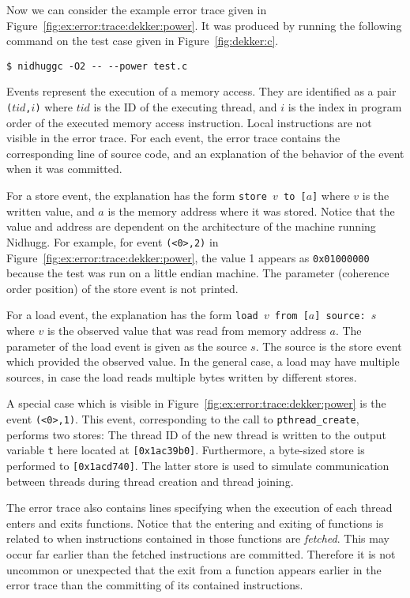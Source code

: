 \documentclass[a4paper]{article}
\begin{document}
Now we can consider the example error trace given in
Figure~\ref{fig:ex:error:trace:dekker:power}. It was produced by
running the following command on the test case given in
Figure~\ref{fig:dekker:c}.

\noindent
\begin{verbatim}
$ nidhuggc -O2 -- --power test.c
\end{verbatim}

\noindent
Events represent the execution of a memory access. They are identified
as a pair \texttt{($tid$,$i$)} where $tid$ is the ID of the executing
thread, and $i$ is the index in program order of the executed memory
access instruction. Local instructions are not visible in the error
trace. For each event, the error trace contains the corresponding line
of source code, and an explanation of the behavior of the event when
it was committed.

For a store event, the explanation has the form
\texttt{store~$v$~to~[$a$]} where $v$ is the written value, and $a$ is
the memory address where it was stored. Notice that the value and
address are dependent on the architecture of the machine running
Nidhugg. For example, for event \texttt{(<0>,2)} in
Figure~\ref{fig:ex:error:trace:dekker:power}, the value 1 appears as
\texttt{0x01000000} because the test was run on a little endian
machine. The parameter (coherence order position) of the store event
is not printed.

For a load event, the explanation has the form
\texttt{load~$v$~from~[$a$]~source:~$s$} where $v$ is the observed
value that was read from memory address $a$. The parameter of the load
event is given as the source $s$. The source is the store event which
provided the observed value. In the general case, a load may have
multiple sources, in case the load reads multiple bytes written by
different stores.

A special case which is visible in
Figure~\ref{fig:ex:error:trace:dekker:power} is the event
\texttt{(<0>,1)}. This event, corresponding to the call to
\texttt{pthread\_create}, performs two stores: The thread ID of the
new thread is written to the output variable \texttt{t} here located
at \texttt{[0x1ac39b0]}. Furthermore, a byte-sized store is performed
to \texttt{[0x1acd740]}. The latter store is used to simulate
communication between threads during thread creation and thread
joining.

The error trace also contains lines specifying when the execution of
each thread enters and exits functions. Notice that the entering and
exiting of functions is related to when instructions contained in
those functions are \emph{fetched}. This may occur far earlier than
the fetched instructions are committed. Therefore it is not uncommon
or unexpected that the exit from a function appears earlier in the
error trace than the committing of its contained instructions.
\end{document}

